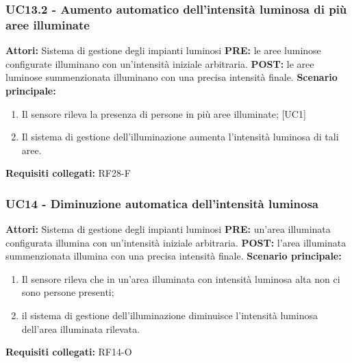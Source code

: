 \documentclass[a4paper, 12pt]{article}
\begin{document}
\subsubsection{UC13.2 - Aumento automatico dell'intensità luminosa di più aree illuminate}
\textbf{Attori:} Sistema di gestione degli impianti luminosi \newline
\textbf{PRE:} le aree luminose configurate illuminano con un'intensità iniziale arbitraria.\newline
\textbf{POST:} le aree luminose summenzionata illuminano con una precisa intensità finale.\newline
\textbf{Scenario principale:}
\begin{enumerate}
    \item Il sensore rileva la presenza di persone in più aree illuminate; [UC1]
    \item Il sistema di gestione dell'illuminazione aumenta l'intensità luminosa di tali aree.
\end{enumerate}
\textbf{Requisiti collegati:} RF28-F\newline

\subsubsection{UC14 - Diminuzione automatica dell'intensità luminosa}
\textbf{Attori:} Sistema di gestione degli impianti luminosi \newline
\textbf{PRE:} un'area illuminata configurata illumina con un'intensità iniziale arbitraria.\newline
\textbf{POST:} l'area illuminata summenzionata illumina con una precisa intensità finale.\newline
\textbf{Scenario principale:}
\begin{enumerate}
    \item Il sensore rileva che in un'area illuminata con intensità luminosa alta non ci sono persone presenti;
    \item il sistema di gestione dell'illuminazione diminuisce l'intensità luminosa dell'area illuminata rilevata.
\end{enumerate}
\textbf{Requisiti collegati:} RF14-O\newline
\end{document}
